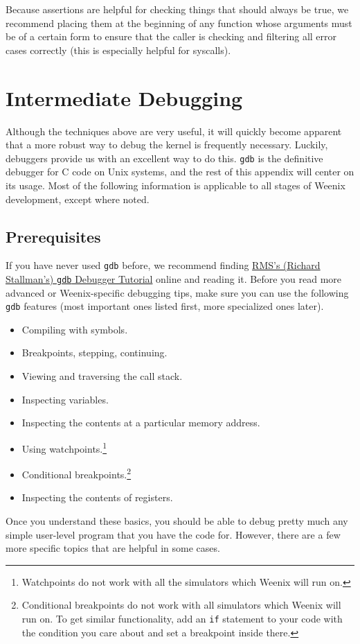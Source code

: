 Because assertions are helpful for checking things that should always be true, we recommend placing them at the beginning of any function whose arguments must be of a certain form to ensure that the caller is checking and filtering all error cases correctly (this is especially helpful for syscalls).

\section{Intermediate Debugging}

Although the techniques above are very useful, it will quickly become apparent that a more robust way to debug the kernel is frequently necessary. Luckily, debuggers provide us with an excellent way to do this. \texttt{gdb} is the definitive debugger for C code on Unix systems, and the rest of this appendix will center on its usage. Most of the following information is applicable to all stages of Weenix development, except where noted.

\subsection{Prerequisites}
If you have never used \texttt{gdb} before, we recommend finding \hyperref{http://www.unknownroad.com/rtfm/gdbtut/gdbtoc.html}{}{}{RMS's (Richard Stallman's) \texttt{gdb} Debugger Tutorial} online and reading it. Before you read more advanced or Weenix-specific debugging tips, make sure you can use the following \texttt{gdb} features (most important ones listed first, more specialized ones later).
\begin{itemize}
    \item Compiling with symbols.
    \item Breakpoints, stepping, continuing.
    \item Viewing and traversing the call stack.
    \item Inspecting variables.
    \item Inspecting the contents at a particular memory address.
    \item Using watchpoints.\footnote{Watchpoints do not work with all the simulators which Weenix will run on.}
    \item Conditional breakpoints.\footnote{Conditional breakpoints do not work with all simulators which Weenix will run on. To get similar functionality, add an \texttt{if} statement to your code with the condition you care about and set a breakpoint inside there.}
    \item Inspecting the contents of registers.
\end{itemize}
Once you understand these basics, you should be able to debug pretty much any simple user-level program that you have the code for. However, there are a few more specific topics that are helpful in some cases.

